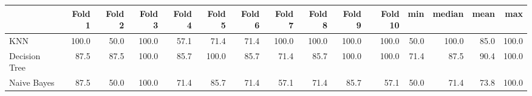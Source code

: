 \begin{tabular}{lrrrrrrrrrrrrrr}
\toprule
{} & Fold 1 & Fold 2 & Fold 3 & Fold 4 & Fold 5 & Fold 6 & Fold 7 & Fold 8 & Fold 9 & Fold 10 &   min & median &  mean &    max \\
\midrule
KNN           & 100.0 & 50.0 & 100.0 & 57.1 & 71.4 & 71.4 & 100.0 & 100.0 & 100.0 & 100.0 & 50.0 & 100.0 & 85.0 & 100.0 \\
Decision Tree & 87.5 & 87.5 & 100.0 & 85.7 & 100.0 & 85.7 & 71.4 & 85.7 & 100.0 & 100.0 & 71.4 & 87.5 & 90.4 & 100.0 \\
Naive Bayes   & 87.5 & 50.0 & 100.0 & 71.4 & 85.7 & 71.4 & 57.1 & 71.4 & 85.7 & 57.1 & 50.0 & 71.4 & 73.8 & 100.0 \\
\bottomrule
\end{tabular}

